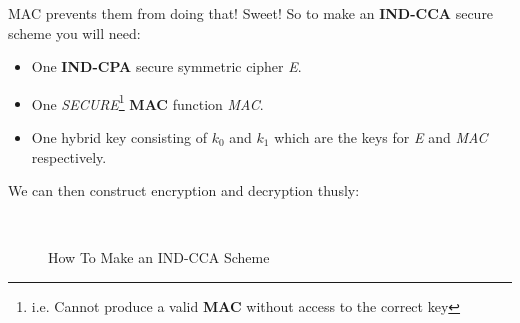     MAC prevents them from doing that! Sweet! So to make an \textbf{IND-CCA} secure scheme you will need:
    \begin{itemize}
        \item One \textbf{IND-CPA} secure symmetric cipher \emph{E}.
        \item One \emph{SECURE}\footnote{i.e. Cannot produce a valid \textbf{MAC} without access to the correct key} \textbf{MAC} function \emph{MAC}.
        \item One hybrid key consisting of $k_{0}$ and $k_{1}$ which are the keys for \emph{E} and \emph{MAC} respectively.
    \end{itemize}

    We can then construct encryption and decryption thusly:
    \begin{figure}[htp!]
    \centering
    ~
    \caption{How To Make an IND-CCA Scheme}
    \label{fig:ind-cca-ed}
    \end{figure}

